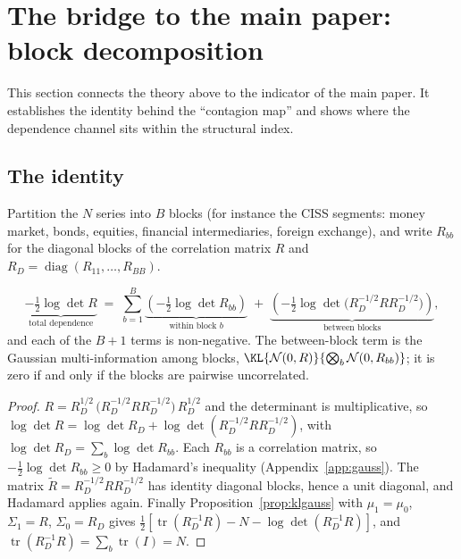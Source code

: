 
\section{The bridge to the main paper: block decomposition}
\label{sec:blocks}

This section connects the theory above to the indicator of the main paper. It
establishes the identity behind the ``contagion map'' and shows where the
dependence channel sits within the structural index.

\subsection{The identity}

Partition the $N$ series into $B$ blocks (for instance the CISS segments: money
market, bonds, equities, financial intermediaries, foreign exchange), and write
$R_{bb}$ for the diagonal blocks of the correlation matrix $R$ and
$R_D=\operatorname{diag}(R_{11},\dots,R_{BB})$.

\begin{proposition}
\label{prop:blocks}
\begin{equation}
\label{eq:blocks}
\underbrace{-\tfrac12\log\det R}_{\text{total dependence}}
\;=\;\sum_{b=1}^{B}\underbrace{\left(-\tfrac12\log\det R_{bb}\right)}_{\text{within block }b}
\;+\;\underbrace{\left(-\tfrac12\log\det\big(R_D^{-1/2}RR_D^{-1/2}\big)\right)}_{\text{between blocks}} ,
\end{equation}
and each of the $B+1$ terms is non-negative. The between-block term is the
Gaussian multi-information among blocks,
$\KL{\mathcal N(0,R)}{\bigotimes_b\mathcal N(0,R_{bb})}$; it is zero if and only
if the blocks are pairwise uncorrelated.
\end{proposition}

\begin{proof}
$R=R_D^{1/2}\,\big(R_D^{-1/2}RR_D^{-1/2}\big)\,R_D^{1/2}$ and the determinant is
multiplicative, so $\log\det R=\log\det R_D+\log\det(R_D^{-1/2}RR_D^{-1/2})$,
with $\log\det R_D=\sum_b\log\det R_{bb}$. Each $R_{bb}$ is a correlation matrix,
so $-\tfrac12\log\det R_{bb}\ge0$ by Hadamard's inequality
(Appendix~\ref{app:gauss}). The matrix $\tilde R=R_D^{-1/2}RR_D^{-1/2}$ has
identity diagonal blocks, hence a unit diagonal, and Hadamard applies again.
Finally Proposition~\ref{prop:klgauss} with $\mu_1=\mu_0$, $\Sigma_1=R$,
$\Sigma_0=R_D$ gives
$\tfrac12[\operatorname{tr}(R_D^{-1}R)-N-\log\det(R_D^{-1}R)]$, and
$\operatorname{tr}(R_D^{-1}R)=\sum_b\operatorname{tr}(I)=N$.
\end{proof}

